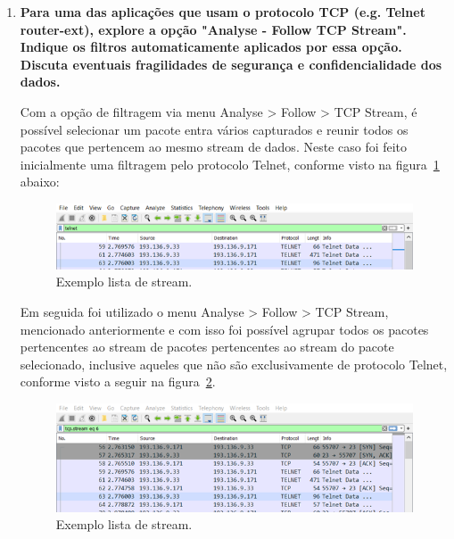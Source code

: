 \documentclass{llncs}
\begin{document}
\begin{enumerate}[\textbf{c)}]
  \item \textbf{Para uma das aplicações que usam o protocolo TCP (e.g. Telnet router-ext), explore a opção "Analyse - Follow TCP Stream". Indique os filtros automaticamente aplicados por essa opção. Discuta eventuais fragilidades
  de segurança e confidencialidade dos dados.}
  
  \vspace{5mm}
  \begin{flushleft}
    \par Com a opção de filtragem via menu Analyse > Follow > TCP Stream, é possível selecionar um pacote entra vários capturados e reunir todos os pacotes que pertencem ao mesmo stream de dados. Neste caso foi feito inicialmente uma filtragem pelo protocolo Telnet, conforme visto na figura~\ref{fig:stream1} abaixo:
    \begin{figure}[h]
      \includegraphics[scale=0.65]{stream1.png}
      \centering
      \caption{Exemplo lista de stream.}
      \label{fig:stream1}
    \end{figure}
  \end{flushleft}

  \begin{flushleft}
    \par Em seguida foi utilizado o menu Analyse > Follow > TCP Stream, mencionado anteriormente e com isso foi possível agrupar todos os pacotes pertencentes ao stream de pacotes pertencentes ao stream do pacote selecionado, inclusive aqueles que não são exclusivamente de protocolo Telnet, conforme visto a seguir na figura~\ref{fig:stream2}.
    \begin{figure}[h]
      \includegraphics[scale=0.65]{stream2.png}
      \centering
      \caption{Exemplo lista de stream.}
      \label{fig:stream2}
    \end{figure}
  \end{flushleft}


\end{enumerate}
\end{document}
